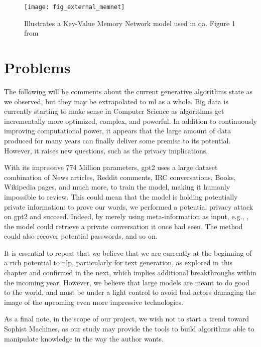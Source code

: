 \begin{figure}[H]
    \centering
    \texttt{[image: fig\_external\_memnet]}
    \caption{Illustrates a Key-Value Memory Network model used in \gls{qa}. Figure 1 from \autocite{paper:journals/corr/MillerFDKBW16}}
    \label{fig:fig_external_memnet}
\end{figure}

\section{Problems}
The following will be comments about the current generative algorithms state as we observed, but they may be extrapolated to \gls{ml} as a whole. Big data is currently starting to make sense in Computer Science as algorithms get incrementally more optimized, complex, and powerful. In addition to continuously improving computational power, it appears that the large amount of data produced for many years can finally deliver some premise to its potential. However, it raises new questions, such as the privacy implications. 

With its impressive 774 Million parameters, \gls{gpt2} uses a large dataset combination of News articles, Reddit comments, IRC conversations, Books, Wikipedia pages, and much more, to train the model, making it humanly impossible to review. This could mean that the model is holding potentially private information: to prove our words, we performed a potential privacy attack on \gls{gpt2} and succeed. Indeed, by merely using meta-information as input, e.g., , the model could retrieve a private conversation it once had seen. The method could also recover potential passwords, and so on.

It is essential to repeat that we believe that we are currently at the beginning of a rich potential to \gls{nlp}, particularly for text generation, as explored in this chapter and confirmed in the next, which implies additional breakthroughs within the incoming year. However, we believe that large models are meant to do good to the world, and must be under a light control to avoid bad actors damaging the image of the upcoming even more impressive technologies.

As a final note, in the scope of our project, we wish not to start a trend toward Sophist Machines, as our study may provide the tools to build algorithms able to manipulate knowledge in the way the author wants.


